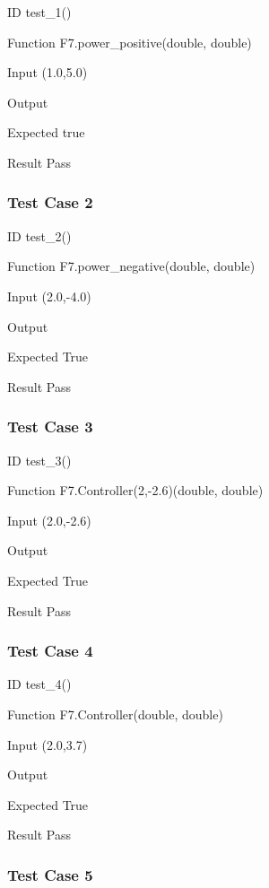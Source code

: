 \documentclass[a4paper,12pt]{article}
\begin{document}
ID  \to  test\_1()

Function \to F7.power\_positive(double, double)

Input \to (1.0,5.0)

Output 

Expected \to true

Result \to Pass





\subsubsection{\textbf{Test Case 2}}

ID  \to   test\_2()

Function \to F7.power\_negative(double, double)

Input \to (2.0,-4.0)

Output 

Expected \to True

Result \to Pass



\subsubsection{\textbf{Test Case 3}}

ID  \to   test\_3()

Function \to F7.Controller(2,-2.6)(double, double)

Input \to (2.0,-2.6)

Output 

Expected \to True

Result \to Pass


\newpage
\subsubsection{\textbf{Test Case 4}}

ID  \to   test\_4()

Function \to F7.Controller(double, double)

Input \to (2.0,3.7)

Output 

Expected \to True

Result \to Pass


\subsubsection{\textbf{Test Case 5}}
\end{document}
